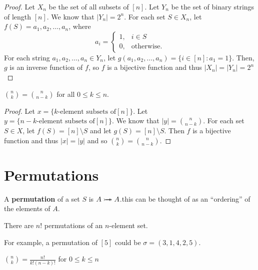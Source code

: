 \documentclass[12pt]{article}
\begin{document}
\begin{proof}
Let $X_n$ be the set of all subsets of $[n]$. Let $Y_n$ be the set of binary strings of length $[n]$. We know that $|Y_n| = 2^n$. For each set $S \in X_n$, let $f(S) = a_1, a_2, \dots, a_n$, where \[ a_i =
\begin{cases}
	1, & i \in S\\
	0, & \text{otherwise}.
\end{cases} \] For each string $a_1, a_2, \dots, a_n \in Y_n$, let $g(a_1, a_2, \dots, a_n) = \{ i \in [n]: a_1 = 1 \}$. Then, $g$ is an inverse function of $f$, so $f$ is a bijective function and thus $|X_n| = |Y_n| = 2^n$
\end{proof}

\begin{lemma}
${n \choose k} = {n \choose n - k}$ for all $0 \leq k \leq n$.
\end{lemma}

\begin{proof}
Let $x = \{ k\text{-element subsets of} [n] \}$. Let $y = \{ n-k\text{-element subsets of} [n] \}$. We know that $|y| = {n \choose n-k}$. For each set $S \in X$, let $f(S) = [n] \setminus S$ and let $g(S) = [n] \setminus S$. Then $f$ is a bijective function and thus $|x| = |y|$ and so ${n \choose k} = {n \choose n - k}$.
\end{proof}

\section{Permutations}
A {\bf permutation} of a set $S$ is $A \rightarrowtail\!\!\!\!\!\twoheadrightarrow A$.\@ this can be thought of as an ``ordering'' of the elements of $A$.

\begin{theorem}
There are $n!$ permutations of an $n$-element set.
\end{theorem}

For example, a permutation of $[5]$ could be $\sigma = (3,1,4,2,5)$.

\begin{lemma}
${n \choose k} = \frac{n!}{k!(n-k)!}$ for $0 \leq k \leq n$
\end{lemma}
\end{document}
